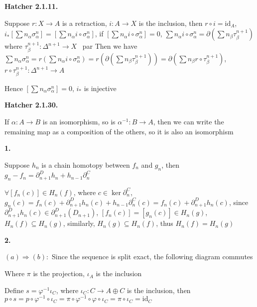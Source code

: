 \documentclass[../main.tex]{subfiles}
\begin{document}
\textbf{Hatcher 2.1.11.} \par
Suppose $r:X\rightarrow A$ is a retraction, $i: A\rightarrow X$ is the inclusion, then $r\circ i=\mathrm{id}_A$, $i_*[\sum n_\alpha\sigma^n_\alpha]=[\sum n_\alpha i\circ\sigma^n_\alpha]$, if $[\sum n_\alpha i\circ\sigma^n_\alpha]=0$, $\sum n_\alpha i\circ\sigma^n_\alpha=\partial\left(\sum n_\beta \tau^{n+1}_\beta\right)$ where $\tau^{n+1}_\beta:\Delta^{n+1}\rightarrow X$ \ par
Then we have $\sum n_\alpha\sigma^n_\alpha=r\left(\sum n_\alpha i\circ\sigma^n_\alpha\right)=r\left(\partial\left(\sum n_\beta \tau^{n+1}_\beta\right)\right)=\partial\left(\sum n_\beta r\circ\tau^{n+1}_\beta\right)$, $r\circ\tau^{n+1}_\beta:\Delta^{n+1}\rightarrow A$ \par
Hence $[\sum n_\alpha\sigma^n_\alpha]=0$, $i_*$ is injective \par
\textbf{Hatcher 2.1.30.} \par
If $\alpha:A\rightarrow B$ is an isomorphism, so is $\alpha^{-1}:B\rightarrow A$, then we can write the remaining map as a composition of the others, so it is also an isomorphism \par
\textbf{1.} \par
Suppose $h_n$ is a chain homotopy between $f_n$ and $g_n$, then $g_n-f_n=\partial^D_{n+1}h_n+h_{n-1}\partial^C_n$ \par
$\forall [f_n(c)]\in H_n(f)$, where $c\in\ker\partial^C_n$, $g_n(c)=f_n(c)+\partial^D_{n+1}h_n(c)+h_{n-1}\partial^C_n(c)=f_n(c)+\partial^D_{n+1}h_n(c)$, since $\partial^D_{n+1}h_n(c)\in\partial^D_{n+1}(D_{n+1})$, $[f_n(c)]=[g_n(c)]\in H_n(g)$, $H_n(f)\subseteq H_n(g)$, similarly, $H_n(g)\subseteq H_n(f)$, thus $H_n(f)= H_n(g)$ \par
\textbf{2.} \par
$(a)\Rightarrow (b):$ Since the sequence is split exact, the following diagram commutes \par
\begin{center}
\end{center}
Where $\pi$ is the projection, $\iota_A$ is the inclusion \par
Define $s=\varphi^{-1}\iota_C$, where $\iota_C: C\rightarrow A\oplus C$ is the inclusion, then $p\circ s=p\circ\varphi^{-1}\circ\iota_C=\pi\circ\varphi^{-1}\circ\varphi\circ\iota_C=\pi\circ\iota_C=\mathrm{id}_C$ \par
\end{document}
